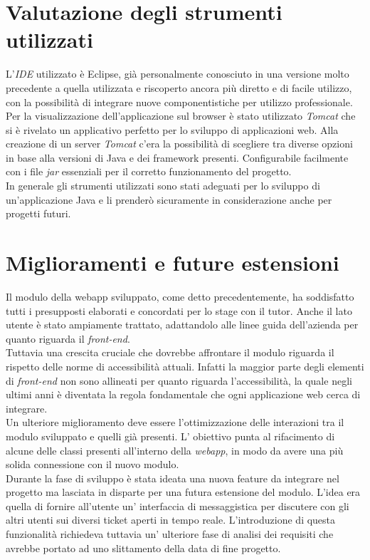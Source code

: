 \section{Valutazione degli strumenti utilizzati}
L'\textit{IDE} utilizzato è Eclipse, già personalmente conosciuto in una versione molto precedente a quella utilizzata e riscoperto ancora più diretto e di facile utilizzo, con la possibilità di integrare nuove componentistiche per utilizzo professionale.\\
Per la visualizzazione dell'applicazione sul browser è stato utilizzato \textit{Tomcat} che si è rivelato un applicativo perfetto per lo sviluppo di applicazioni web. Alla creazione di un server \textit{Tomcat} c'era la possibilità di scegliere tra diverse opzioni in base alla versioni di Java e dei framework presenti. Configurabile facilmente con i file \textit{jar} essenziali per il corretto funzionamento del progetto.\\
In generale gli strumenti utilizzati sono stati adeguati per lo sviluppo di un'applicazione Java e li prenderò sicuramente in considerazione anche per progetti futuri.
 
\section{Miglioramenti e future estensioni}
Il modulo della webapp sviluppato, come detto precedentemente, ha soddisfatto tutti i presupposti elaborati e concordati per lo stage con il tutor. Anche il lato utente è stato ampiamente trattato, adattandolo alle linee guida dell'azienda per quanto riguarda il \textit{front-end}.\\
Tuttavia una crescita cruciale che dovrebbe affrontare il modulo riguarda il rispetto delle norme di accessibilità attuali. Infatti la maggior parte degli elementi di \textit{front-end} non sono allineati per quanto riguarda l'accessibilità, la quale negli ultimi anni è diventata la regola fondamentale che ogni applicazione web cerca di integrare.\\
Un ulteriore miglioramento deve essere l'ottimizzazione delle interazioni tra il modulo sviluppato e quelli già presenti. L' obiettivo punta al rifacimento di alcune delle classi presenti all'interno della \textit{webapp}, in modo da avere una più solida connessione con il nuovo modulo. \\
Durante la fase di sviluppo è stata ideata una nuova feature da integrare nel progetto ma lasciata in disparte per una futura estensione del modulo. L'idea era quella di fornire all'utente un' interfaccia di messaggistica per discutere con gli altri utenti sui diversi ticket aperti in tempo reale. L'introduzione di questa funzionalità richiedeva tuttavia un' ulteriore fase di analisi dei requisiti che avrebbe portato ad uno slittamento della data di fine progetto. 

\clearpage
\mbox{}
\newpage
